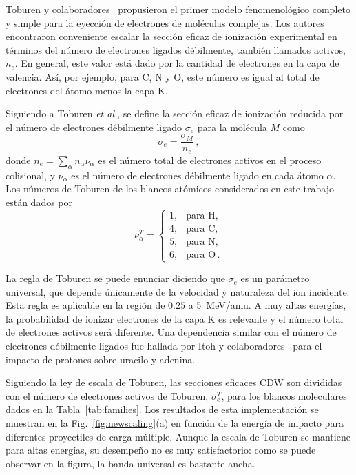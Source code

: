 Toburen y colaboradores~\cite{Toburen:75,Toburen:76} propusieron el 
primer modelo fenomenológico completo y simple para la eyección de 
electrones de moléculas complejas. Los autores encontraron conveniente 
escalar la sección eficaz de ionización experimental en términos del 
número de electrones ligados débilmente, también llamados activos, 
$n_e$. En general, este valor está dado por la cantidad de electrones 
en la capa de valencia. Así, por ejemplo, para C, N y O, este número es 
igual al total de electrones del átomo menos la capa K. 

Siguiendo a Toburen \textit{et al.}, se define la sección eficaz de 
ionización reducida por el número de electrones débilmente ligado 
$\sigma_e$ para la molécula $M$ como
\begin{equation}
\sigma_e=\frac{\sigma_M}{n_e}\,, 
\label{eq:cross-ne} 
\end{equation}
donde $n_e=\sum_{\alpha}n_{\alpha}\nu_{\alpha}$ es el número total de 
electrones activos en el proceso colisional, y $\nu_{\alpha}$ es el 
número de electrones débilmente ligado en cada átomo $\alpha$. Los 
números de Toburen de los blancos atómicos considerados en este trabajo 
están dados por 
\begin{equation}
\nu_{\alpha}^T=\left\{ 
\begin{array}{ll}
1, & \text{para H,} \\
4, & \text{para C,} \\ 
5, & \text{para N,} \\ 
6, & \text{para O}\,.
\end{array}\right.
\label{eq:neToburen} 
\end{equation} 

La regla de Toburen se puede enunciar diciendo que $\sigma_{e}$ es un 
parámetro universal, que depende únicamente de la velocidad y naturaleza
del ion incidente. Esta regla es aplicable en la región de $0.25$ a 
5~MeV/amu. A muy altas energías, la probabilidad de ionizar electrones 
de la capa K es relevante y el número total de electrones activos será 
diferente. Una dependencia similar con el número de electrones 
débilmente ligados fue hallada por Itoh y colaboradores~\cite{itoh2013} 
para el impacto de protones sobre uracilo y adenina.

Siguiendo la ley de escala de Toburen, las secciones eficaces CDW son 
divididas con el número de electrones activos de Toburen, 
$\sigma_{e}^T$, para los blancos moleculares dados en la 
Tabla~\ref{tab:families}. Los resultados de esta implementación se 
muestran en la Fig.~\ref{fig:newscaling}(a) en función de la energía de 
impacto para diferentes proyectiles de carga múltiple. Aunque la escala 
de Toburen se mantiene para altas energías, su desempeño no es muy 
satisfactorio: como se puede observar en la figura, la banda universal 
es bastante ancha.


